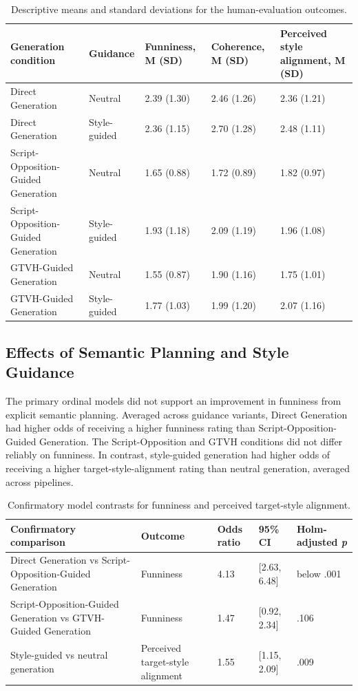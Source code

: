 \documentclass[11pt]{article}
\begin{document}
\begin{table}[t]
\centering
\caption{Descriptive means and standard deviations for the human-evaluation outcomes.}\label{tab:descriptive-results}
\scriptsize\begin{tabularx}{\textwidth}{YYYYY}
\toprule\noalign{}
Generation condition & Guidance & Funniness, M (SD) & Coherence, M (SD) & Perceived style alignment, M (SD) \\
\midrule\noalign{}

Direct Generation & Neutral & 2.39 (1.30) & 2.46 (1.26) & 2.36 (1.21) \\
Direct Generation & Style-guided & 2.36 (1.15) & 2.70 (1.28) & 2.48 (1.11) \\
Script-Opposition-Guided Generation & Neutral & 1.65 (0.88) & 1.72 (0.89) & 1.82 (0.97) \\
Script-Opposition-Guided Generation & Style-guided & 1.93 (1.18) & 2.09 (1.19) & 1.96 (1.08) \\
GTVH-Guided Generation & Neutral & 1.55 (0.87) & 1.90 (1.16) & 1.75 (1.01) \\
GTVH-Guided Generation & Style-guided & 1.77 (1.03) & 1.99 (1.20) & 2.07 (1.16) \\
\bottomrule
\end{tabularx}\end{table}

\subsection{Effects of Semantic Planning and Style Guidance}\label{effects-of-semantic-planning-and-style-guidance}

The primary ordinal models did not support an improvement in funniness from explicit semantic planning. Averaged across guidance variants, Direct Generation had higher odds of receiving a higher funniness rating than Script-Opposition-Guided Generation. The Script-Opposition and GTVH conditions did not differ reliably on funniness. In contrast, style-guided generation had higher odds of receiving a higher target-style-alignment rating than neutral generation, averaged across pipelines.

\begin{table}[t]
\centering
\caption{Confirmatory model contrasts for funniness and perceived target-style alignment.}\label{tab:confirmatory-contrasts}
\scriptsize\begin{tabularx}{\textwidth}{YYYYY}
\toprule\noalign{}
Confirmatory comparison & Outcome & Odds ratio & 95\% CI & Holm-adjusted \emph{p} \\
\midrule\noalign{}

Direct Generation vs Script-Opposition-Guided Generation & Funniness & 4.13 & {[}2.63, 6.48{]} & below .001 \\
Script-Opposition-Guided Generation vs GTVH-Guided Generation & Funniness & 1.47 & {[}0.92, 2.34{]} & .106 \\
Style-guided vs neutral generation & Perceived target-style alignment & 1.55 & {[}1.15, 2.09{]} & .009 \\
\bottomrule
\end{tabularx}\end{table}
\end{document}
